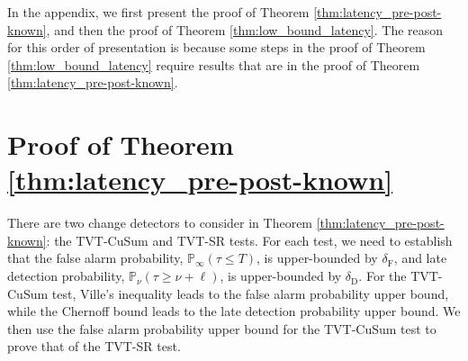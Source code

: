 \documentclass[12pt]{interact}
\newcommand{\lp}{\left(}
\newcommand{\rp}{\right)}
\newcommand{\mrm}{\mathrm}
\renewcommand{\Pr}{\mathbb{P}}
\theoremstyle{plain}
\newcommand{\vvv}[1]{{\color{red}{#1}}}
\begin{document}
In the appendix, we first present the proof of Theorem \ref{thm:latency_pre-post-known}, and then the proof of Theorem \ref{thm:low_bound_latency}. The reason for this order of presentation is because some steps in the proof of Theorem \ref{thm:low_bound_latency} require results that are in the proof of Theorem \ref{thm:latency_pre-post-known}. 

\section{Proof of Theorem \ref{thm:latency_pre-post-known}} \label{sec:thm2}

There are two change detectors to consider in Theorem \ref{thm:latency_pre-post-known}: the TVT-CuSum and TVT-SR tests. For each test, we need to establish that the false alarm probability, $\Pr_{\infty} \lp \tau \leq T \rp$, is upper-bounded by $\delta_{\mrm{F}}$, and late detection probability, $\Pr_{\nu} \lp \tau \geq \nu + \ell \rp$, is upper-bounded by $\delta_{\mrm{D}}$. For the TVT-CuSum test, Ville's inequality \citep{ville1939etude} leads to the false alarm probability upper bound, while the Chernoff bound  leads to the late detection probability upper bound. We then use the false alarm probability upper bound for the TVT-CuSum test to prove that of the TVT-SR test. 
\end{document}
